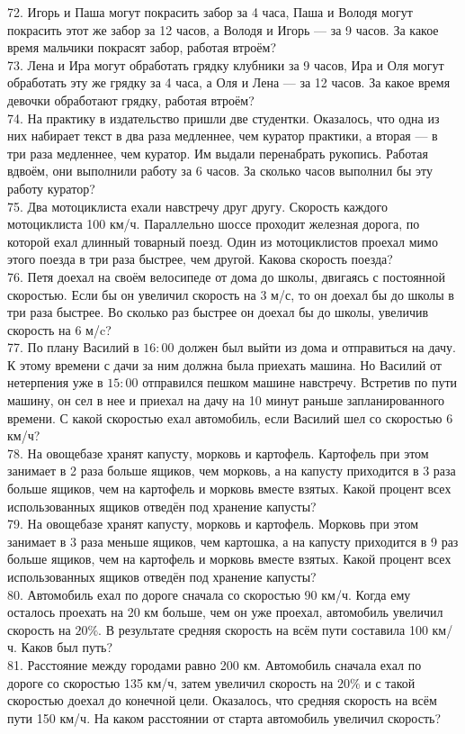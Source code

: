 72. Игорь и Паша могут покрасить забор за 4 часа, Паша и Володя могут покрасить этот же забор за 12 часов, а Володя и Игорь --- за 9 часов. За какое время мальчики покрасят забор, работая втроём?\\
73. Лена и Ира могут обработать грядку клубники за 9 часов, Ира и Оля могут обработать эту же грядку за 4 часа, а Оля и Лена --- за 12 часов. За какое время девочки обработают грядку, работая втроём?\\
74. На практику в издательство пришли две студентки. Оказалось, что одна из них набирает текст в два раза медленнее, чем куратор практики, а вторая --- в три раза медленнее, чем куратор. Им выдали перенабрать рукопись. Работая вдвоём, они выполнили работу за 6 часов. За сколько часов выполнил бы эту работу куратор?\\
75. Два мотоциклиста ехали навстречу друг другу. Скорость каждого мотоциклиста 100 км/ч. Параллельно шоссе проходит железная дорога, по которой ехал длинный товарный поезд. Один из мотоциклистов проехал мимо этого поезда в три раза быстрее, чем другой. Какова скорость поезда?\\
76. Петя доехал на своём велосипеде от дома до школы, двигаясь с постоянной скоростью. Если бы он увеличил скорость на 3 м/с, то он доехал бы до школы в три раза быстрее. Во сколько раз быстрее он доехал бы до школы, увеличив скорость на 6 м/c?\\
77. По плану Василий в $16:00$ должен был выйти из дома и отправиться на дачу. К этому времени с дачи за ним должна была приехать машина. Но Василий от нетерпения уже в $15:00$ отправился пешком машине навстречу. Встретив по пути машину, он сел в нее и приехал на дачу на 10 минут раньше запланированного времени. С какой скоростью ехал автомобиль, если Василий шел со скоростью 6 км/ч?\\
78. На овощебазе хранят капусту, морковь и картофель. Картофель при этом занимает в 2 раза больше ящиков, чем морковь, а на капусту приходится в 3 раза больше ящиков, чем на картофель и морковь вместе взятых. Какой процент всех использованных ящиков отведён под хранение капусты?\\
79. На овощебазе хранят капусту, морковь и картофель. Морковь при этом занимает в 3 раза меньше ящиков, чем картошка, а на капусту приходится в 9 раз больше ящиков, чем на картофель и морковь вместе взятых. Какой процент всех использованных ящиков отведён под хранение капусты?\\
80. Автомобиль ехал по дороге сначала со скоростью 90 км/ч. Когда ему осталось проехать на
20 км больше, чем он уже проехал, автомобиль увеличил скорость на $20\%.$ В результате средняя
скорость на всём пути составила 100 км/ч. Каков был путь?\\
81.  Расстояние между городами равно 200 км. Автомобиль сначала ехал по дороге со скоростью
135 км/ч, затем увеличил скорость на $20\%$ и с такой скоростью доехал до конечной цели. Оказалось,
что средняя скорость на всём пути 150 км/ч. На каком расстоянии от старта автомобиль увеличил
скорость?
\newpage
